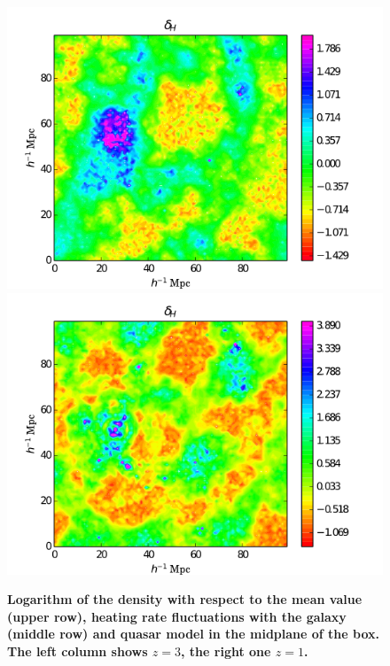 \documentclass[twocolumns]{emulateapj}
\newcommand\ALc[1]{{\color{red} \bf #1}} %
\begin{document}
\begin{figure}
\includegraphics[width = .45\textwidth ]{data_delta_z3_qso4.png}
\includegraphics[width = .45\textwidth ]{data_delta_z1_qso4.png}

   \caption{ \ALc{Logarithm of the density with respect to the mean value (upper row), heating rate fluctuations with the galaxy (middle row) and quasar model  in the midplane of the box. The left column shows $z=3$, the right one $z=1$. }}
  \label{fig:slice}
\end{figure}
\end{document}
